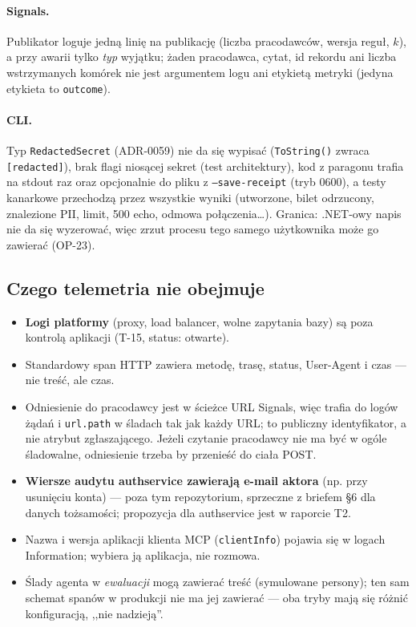\paragraph{Signals.} Publikator loguje jedną linię na publikację (liczba pracodawców,
wersja reguł, $k$), a przy awarii tylko \emph{typ} wyjątku; żaden pracodawca, cytat,
id rekordu ani liczba wstrzymanych komórek nie jest argumentem logu ani etykietą
metryki (jedyna etykieta to \texttt{outcome}).

\paragraph{CLI.} Typ \texttt{RedactedSecret} (ADR-0059) nie da się wypisać
(\texttt{ToString()} zwraca \texttt{[redacted]}), brak flagi niosącej sekret
(test architektury), kod z paragonu trafia na stdout raz oraz opcjonalnie do pliku z
\texttt{--save-receipt} (tryb 0600), a testy kanarkowe przechodzą przez wszystkie wyniki
(utworzone, bilet odrzucony, znalezione PII, limit, 500 echo, odmowa połączenia\ldots).
Granica: .NET-owy napis nie da się wyzerować, więc zrzut procesu tego samego
użytkownika może go zawierać (OP-23).

\subsection{Czego telemetria nie obejmuje}

\begin{itemize}[leftmargin=*]
    \item \textbf{Logi platformy} (proxy, load balancer, wolne zapytania bazy) są poza
    kontrolą aplikacji (T-15, status: otwarte).
    \item Standardowy span HTTP zawiera metodę, trasę, status, User-Agent i czas ---
    nie treść, ale czas.
    \item Odniesienie do pracodawcy jest w ścieżce URL Signals, więc trafia do logów
    żądań i \texttt{url.path} w śladach tak jak każdy URL; to publiczny
    identyfikator, a nie atrybut zgłaszającego. Jeżeli czytanie pracodawcy nie ma być
    w ogóle śladowalne, odniesienie trzeba by przenieść do ciała POST.
    \item \textbf{Wiersze audytu authservice zawierają e-mail aktora} (np. przy
    usunięciu konta) --- poza tym repozytorium, sprzeczne z briefem §6 dla danych
    tożsamości; propozycja dla authservice jest w raporcie T2.
    \item Nazwa i wersja aplikacji klienta MCP (\texttt{clientInfo}) pojawia się w
    logach Information; wybiera ją aplikacja, nie rozmowa.
    \item Ślady agenta w \emph{ewaluacji} mogą zawierać treść (symulowane persony);
    ten sam schemat spanów w produkcji nie ma jej zawierać --- oba tryby mają się
    różnić konfiguracją, ,,nie nadzieją''.
\end{itemize}

